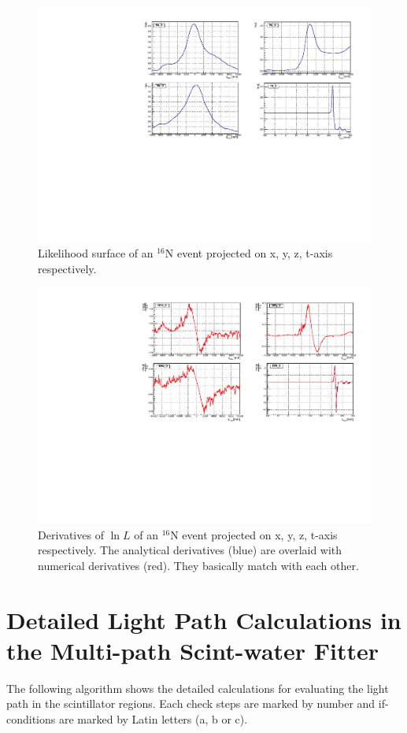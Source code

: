 \begin{figure}
	\centering
	\includegraphics[width=160mm]{logL_xyzt.pdf}
	\caption{Likelihood surface of an {$^{16}$}N event projected on x, y, z, t-axis respectively.}
	\label{logLxyz}
\end{figure}

\begin{figure}
	\centering
	\includegraphics[width=160mm]{derivativeLogL_xyzt.pdf}
	\caption{Derivatives of $\ln L$ of an {$^{16}$}N event projected on x, y, z, t-axis respectively. The analytical derivatives (blue) are overlaid with numerical derivatives (red). They basically match with each other.}
	\label{derivative_logLxyz}
\end{figure}

\section{Detailed Light Path Calculations in the Multi-path Scint-water Fitter}\label{appendix:lightpath}
The following algorithm shows the detailed calculations for evaluating the light path in the scintillator regions. Each check steps are marked by number and if-conditions are marked by Latin letters (a, b or c). 

